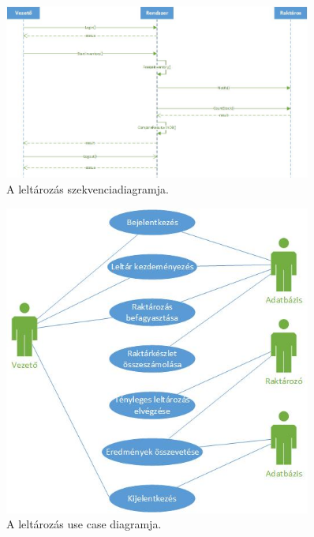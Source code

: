 \documentclass[12pt]{article}\usepackage[left=20mm,right=20mm,top=15mm,bottom=20mm]{geometry}
\begin{document}
\begin{figure}[!h]
    \centering
        \includegraphics[width=0.9\textwidth]{figures/leltarazas_SD.jpg}
        \caption{A leltározás szekvenciadiagramja.}
\end{figure}

\begin{figure}[!h]
    \centering
        \includegraphics[width=0.9\textwidth]{figures/leltarazas_UC.jpg}
        \caption{A leltározás use case diagramja.}
\end{figure}

\FloatBarrier
\end{document}
